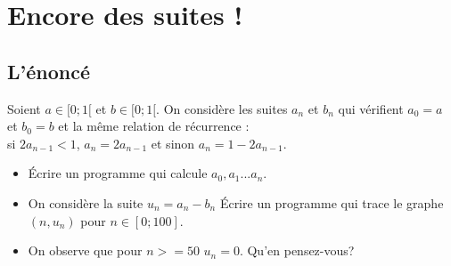 \documentclass[a4paper,11pt]{book}
\begin{document}
\section{Encore des suites !}
\subsection{L'\'enonc\'e}
Soient $a\in[0;1[$ et $b\in[0;1[$.
On consid\`ere les suites $a_n$ et $b_n$ qui v\'erifient $a_0=a$ et $b_0=b$ et 
la m\^eme relation de r\'ecurrence :\\
si $2a_{n-1}<1$, $a_n=2a_{n-1}$ et sinon $a_n=1-2a_{n-1}$.
\begin{itemize}
\item \'Ecrire un programme qui calcule $a_0,a_1...a_n$. 
\item On consid\`ere la suite $u_n=a_n-b_n$
\'Ecrire un programme qui trace le graphe $(n,u_n)$ pour $n\in[0;100]$. 
\item On observe que pour $n>=50$ $u_n=0$. Qu'en pensez-vous?
\end{itemize}
\end{document}

